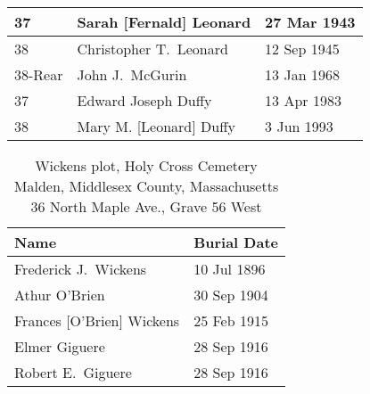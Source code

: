 \begin{table}[ht]
\begin{tabular}{|l|l|l|}
		37 & Sarah [Fernald] Leonard\index{Fernald!Sarah Helen\textsuperscript{4}}\index{Leonard!Sarah Helen\textsuperscript{4} (Fernald)} & 27 Mar 1943 \\ \hline
		38 & Christopher T.\ Leonard\index{Leonard!Christopher T.} & 12 Sep 1945 \\ \hline
		38-Rear & John J.\ McGurin\index{McGurin!John Joseph} & 13 Jan 1968 \\ \hline
		37 & Edward Joseph Duffy\index{Duffy!Edward J.} & 13 Apr 1983 \\ \hline
		38 & Mary M. [Leonard] Duffy\index{Leonard!Mary Margaret\textsuperscript{5}}\index{Duffy!Mary Margaret\textsuperscript{5} (Leonard)} & 3 Jun 1993 \\ \hline
	\end{tabular}
\end{table}

\begin{table}[ht]
	\centering
	\caption{Wickens plot, Holy Cross Cemetery\cite{HolyCrossPlotWickens}\\
		Malden, Middlesex County, Massachusetts\\
		36 North Maple Ave., Grave 56 West}
	\begin{tabular}{|l|l|}
		\hline
		\textbf{Name} & \textbf{Burial Date}\\
		\hline
		Frederick J.\ Wickens\index{Wickens!Frederick John\textsuperscript{3}} & 10 Jul 1896 \\ 
		\hline
		Athur O'Brien\index{O'Brien!Arthur Francis\textsuperscript{4}} & 30 Sep 1904 \\ 
		\hline
		Frances [O'Brien] Wickens\index{O'Brien!Frances Elizabeth\textsuperscript{3}}\index{Wickens!Frances Elizabeth\textsuperscript{3} (O'Brien)} & 25 Feb 1915 \\ 
		\hline
		Elmer Giguere\index{Giguere, George Elmer\textsuperscript{5}}\index{Giguere, Elmer\textsuperscript{5}} & 28 Sep 1916 \\ 
		\hline
		Robert E.\ Giguere\index{Giguere!Robert E.\textsuperscript{5}} & 28 Sep 1916 \\ 
		\hline
	\end{tabular}
\end{table}
		
